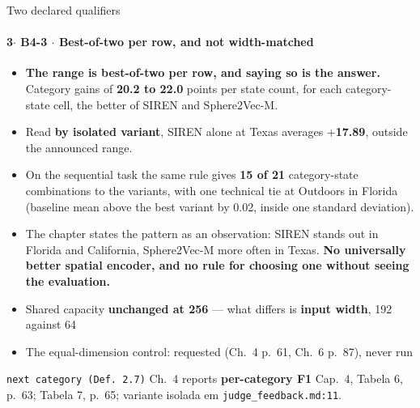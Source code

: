 \documentclass{beamer}
\begin{document}
\begin{frame}[noframenumbering]{Two declared qualifiers}
    \framesubtitle{\normalsize 3$\cdot$ \textbf{B4-3} $\cdot$ Best-of-two per row, and not width-matched}
    \hypertarget{b43}{}
    \hypertarget{b41}{}%
    \small\begin{itemize}\setlength{\itemsep}{0pt}\setlength{\parskip}{0pt}
        \item \textcolor{alert}{\textbf{The range is best-of-two per row, and saying so is the answer.}} Category gains of \textbf{20.2 to 22.0} points per state count, for each category-state cell, the better of SIREN and Sphere2Vec-M.
        \item Read \textbf{by isolated variant}, SIREN alone at Texas averages \textbf{$+$17.89}, outside the announced range.
        \item On the sequential task the same rule gives \textbf{15 of 21} category-state combinations to the variants, with one technical tie at Outdoors in Florida (baseline mean above the best variant by 0.02, inside one standard deviation).
        \item The chapter states the pattern as an observation: SIREN stands out in Florida and California, Sphere2Vec-M more often in Texas. \textbf{No universally better spatial encoder, and no rule for choosing one without seeing the evaluation.}
        \item Shared capacity \textbf{unchanged at 256} --- what differs is \textbf{input width}, 192 against 64
        \item The equal-dimension control: requested (Ch.~4 p.~61, Ch.~6 p.~87), \alert{never run}
    \end{itemize}
    \vfill
    {\scriptsize\texttt{next category (Def.~2.7)} \textbullet{} Ch.~4 reports \textbf{per-category F1} \textbullet{} \textcolor{black!70}{Cap.~4, Tabela 6, p.~63; Tabela 7, p.~65; variante isolada em \texttt{judge\_feedback.md:11}.}\hfill\hyperlink{b0}{}}
\end{frame}
\end{document}
